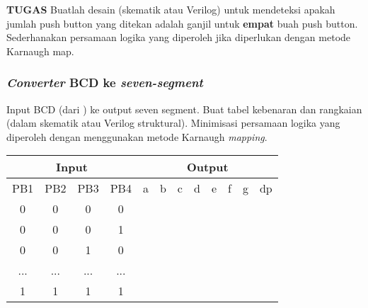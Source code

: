 \textbf{TUGAS} Buatlah desain (skematik atau Verilog) untuk mendeteksi apakah
jumlah push button yang ditekan adalah ganjil untuk \textbf{empat} buah
push button. Sederhanakan persamaan logika yang diperoleh jika diperlukan
dengan metode Karnaugh map.


\subsubsection{\textit{Converter} BCD ke \textit{seven-segment}}

Input BCD (dari ) ke output seven segment. Buat tabel kebenaran dan rangkaian (dalam skematik
atau Verilog struktural). Minimisasi persamaan logika yang diperoleh dengan menggunakan
metode Karnaugh \textit{mapping}.

{\centering
\begin{tabular}{|c|c|c|c||c|c|c|c|c|c|c|c|}
\hline
\multicolumn{4}{|c||}{Input} & \multicolumn{8}{|c|}{Output} \\
\hline
PB1 & PB2 & PB3 & PB4 & a & b & c & d & e & f & g & dp \\
\hline
0 & 0 & 0 & 0 &  &  &  &  &  &  &  & \\
0 & 0 & 0 & 1 &  &  &  &  &  &  &  & \\
0 & 0 & 1 & 0 &  &  &  &  &  &  &  & \\
... & ... & ... & ... &  &  &  &  &  &  &  & \\
1 & 1 & 1 & 1 &  &  &  &  &  &  &  & \\
\hline
\end{tabular}
\par}
